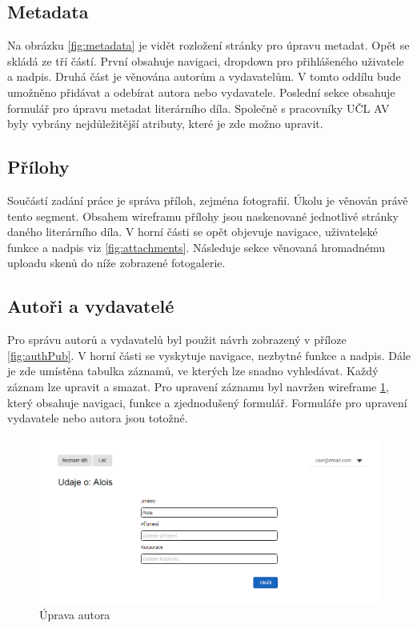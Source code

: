        \subsection{Metadata}
            Na obrázku \ref{fig:metadata} je vidět rozložení stránky pro úpravu metadat. Opět se skládá ze tří částí. První obsahuje navigaci, dropdown pro přihlášeného uživatele a nadpis. Druhá část je věnována autorům a vydavatelům. V tomto oddílu bude umožněno přidávat a odebírat autora nebo vydavatele. Poslední sekce obsahuje formulář pro úpravu metadat literárního díla. Společně s pracovníky UČL AV byly vybrány nejdůležitější atributy, které je zde možno upravit. 
        
        \subsection{Přílohy}
            Součástí zadání práce je správa příloh, zejména fotografií. Úkolu je věnován právě tento segment. Obsahem wireframu přílohy jsou naskenované jednotlivé stránky daného literárního díla. V horní části se opět objevuje navigace, uživatelské funkce a nadpis viz \ref{fig:attachments}. Následuje sekce věnovaná hromadnému uploadu skenů do níže zobrazené fotogalerie.
            
        \subsection{Autoři a vydavatelé}
            Pro správu autorů a vydavatelů byl použit návrh zobrazený v příloze \ref{fig:authPub}. V horní části se vyskytuje navigace, nezbytné funkce a nadpis. Dále je zde umístěna tabulka záznamů, ve kterých lze snadno vyhledávat. Každý záznam lze upravit a smazat. Pro upravení záznamu byl navržen wireframe \ref{fig:edit}, který obsahuje navigaci, funkce a zjednodušený formulář. Formuláře pro upravení vydavatele nebo autora jsou totožné.
            
            \begin {figure}[H]\centering
                \includegraphics[width=\textwidth]{images/edit}
                \caption {Úprava autora}
                \label {fig:edit}
            \end{figure}
            
